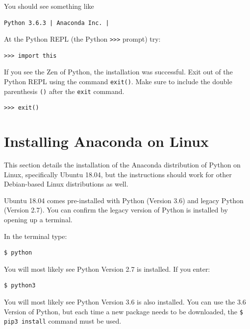 \documentclass{book}
\begin{document}
You should see something like

\begin{lstlisting}
Python 3.6.3 | Anaconda Inc. |
\end{lstlisting}

At the Python REPL (the Python \lstinline!>>>! prompt) try:

\begin{lstlisting}
>>> import this
\end{lstlisting}

If you see the Zen of Python, the installation was successful. Exit out
of the Python REPL using the command \lstinline!exit()!. Make sure to
include the double parenthesis \lstinline!()! after the \lstinline!exit!
command.

\begin{lstlisting}
>>> exit()
\end{lstlisting}
    




    
        \section{Installing Anaconda on
Linux}\label{installing-anaconda-on-linux}
    




    
        This section details the installation of the Anaconda distribution of
Python on Linux, specifically Ubuntu 18.04, but the instructions should
work for other Debian-based Linux distributions as well.

Ubuntu 18.04 comes pre-installed with Python (Version 3.6) and legacy
Python (Version 2.7). You can confirm the legacy version of Python is
installed by opening up a terminal.

In the terminal type:

\begin{lstlisting}
$ python
\end{lstlisting}

You will most likely see Python Version 2.7 is installed. If you enter:

\begin{lstlisting}
$ python3
\end{lstlisting}

You will most likely see Python Version 3.6 is also installed. You can
use the 3.6 Version of Python, but each time a new package needs to be
downloaded, the \lstinline!$ pip3 install! command must be used.
\end{document}
